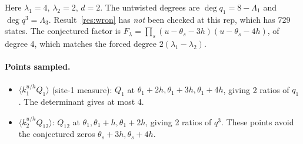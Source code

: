 \documentclass[11pt]{article}
\theoremstyle{definition}
\theoremstyle{remark}
\begin{document}
Here $\lambda_1=4$, $\lambda_2=2$, $d=2$. The untwisted degrees are $\deg q_1=8-\Lambda_1$ and $\deg q^3=\Lambda_3$. Result~\ref{res:wron} has \emph{not} been checked at this rep, which has 729 states. The conjectured factor is $F_\lambda=\prod_s(u-\theta_s-3h)(u-\theta_s-4h)$, of degree 4, which matches the forced degree $2(\lambda_1-\lambda_2)$.

\paragraph{Points sampled.}
\begin{itemize}
\item $\langle k_1^{u/h}Q_1\rangle$ (site-1 measure): $Q_1$ at $\theta_1+2h,\theta_1+3h,\theta_1+4h$, giving 2 ratios of $q_1$. The determinant gives at most 4.
\item $\langle k_2^{u/h}Q_{12}\rangle$: $Q_{12}$ at $\theta_1,\theta_1+h,\theta_1+2h$, giving 2 ratios of $q^3$. These points avoid the conjectured zeros $\theta_s+3h,\theta_s+4h$.
\end{itemize}
\end{document}
